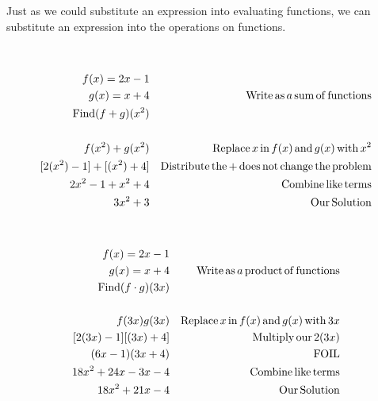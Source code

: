 {Just as we could substitute an expression into evaluating functions, we can
substitute an expression into the operations on functions.

\begin{example}
 \ 
\end{example}
  
  \begin{eqnarray*}
    f (x) = 2 x - 1 &  & \\
    g (x) = x + 4 &  & \operatorname{Write} \operatorname{as} a \operatorname{sum} \operatorname{of}
    \operatorname{functions}\\
    \operatorname{Find} (f + g) (x^2) &  & \\
    &  & \\
    f (x^2) + g (x^2) &  & \operatorname{Replace} x \operatorname{in} f (x) \operatorname{and} g (x)
    \operatorname{with} x^2\\
    {}[2 (x^2) - 1] + [(x^2) + 4] &  & \operatorname{Distribute} \operatorname{the} +
    \operatorname{does} \operatorname{not} \operatorname{change} \operatorname{the} \operatorname{problem}\\
    2 x^2 - 1 + x^2 + 4 &  & \operatorname{Combine} \operatorname{like} \operatorname{terms}\\
    3 x^2 + 3 &  & \operatorname{Our} \operatorname{Solution}
  \end{eqnarray*}


\begin{example}
 \ 
\end{example}
  
  \begin{eqnarray*}
    f (x) = 2 x - 1 &  & \\
    g (x) = x + 4 &  & \operatorname{Write} \operatorname{as} a \operatorname{product} \operatorname{of}
    \operatorname{functions}\\
    \operatorname{Find} (f \cdot g) (3 x) &  & \\
    &  & \\
    f (3 x) g (3 x) &  & \operatorname{Replace} x \operatorname{in} f (x) \operatorname{and} g (x)
    \operatorname{with} 3 x\\
    {}[2 (3 x) - 1] [(3 x) + 4] &  & \operatorname{Multiply} \operatorname{our} 2 (3 x)\\
    (6 x - 1) (3 x + 4) &  & \operatorname{FOIL}\\
    18 x^2 + 24 x - 3 x - 4 &  & \operatorname{Combine} \operatorname{like} \operatorname{terms}\\
    18 x^2 + 21 x - 4 &  & \operatorname{Our} \operatorname{Solution}
  \end{eqnarray*}
}

